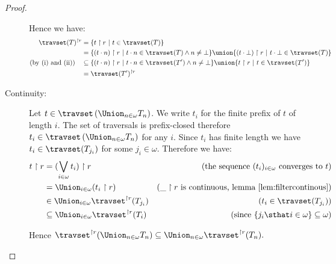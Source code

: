 \begin{proof}
\begin{description}
        Hence we have:
        \begin{align*}
        \travset(T)^{\upharpoonright r} &= \{ t \upharpoonright r \ | \ t \in \travset(T)     \} \\
        & = \{ (t\cdot n) \upharpoonright r \ | \ t\cdot n \in \travset(T) \wedge n \neq \bot \}
            \union \{ (t \cdot \bot ) \upharpoonright r \ | \ t \cdot \bot \in \travset(T)  \} \\
\mbox{(by (i) and (ii))} \quad        & \subseteq  \{ (t\cdot n) \upharpoonright r \ | \ t\cdot n \in \travset(T') \wedge n \neq \bot \}
            \union \{ t \upharpoonright r \ | \ t \in \travset(T')  \} \\
        & = \travset(T')^{\upharpoonright r}
        \end{align*}

        \item[Continuity:] Let $t \in \travset \left( \Union_{n\in\omega} T_n \right)$.
        We write $t_i$ for the finite prefix of $t$ of length $i$.
        The set of traversals is prefix-closed therefore $t_i \in \travset \left( \Union_{n\in\omega} T_n \right)$ for any $i$.
        Since $t_i$ has finite length we have $t_i \in \travset(T_{j_i})$ for some $j_i \in \omega$.
        Therefore we have:
        \begin{align*}
          t \upharpoonright r &= (\bigvee_{i\in\omega} t_i ) \upharpoonright r   & (\mbox{the sequence $(t_i)_{i\in\omega}$ converges to $t$}) \\
          &= \Union_{i\in\omega} ( t_i \upharpoonright r )   & (\_ \upharpoonright r \mbox{ is continuous, lemma \ref{lem:filtercontinous}}) \\
          &\in \Union_{i\in\omega} \travset^{\upharpoonright r}(T_{j_i})   & (t_i \in \travset(T_{j_i})) \\
          &\subseteq \Union_{i\in\omega} \travset^{\upharpoonright r}(T_i)   & (\mbox{since } \{ j_i \sthat i \in \omega \} \subseteq \omega)
        \end{align*}

        Hence $\travset^{\upharpoonright r} (\Union_{n\in\omega} T_n ) \subseteq \Union_{n\in\omega} \travset^{\upharpoonright r}(T_n).$

    \end{description}
\end{proof}

